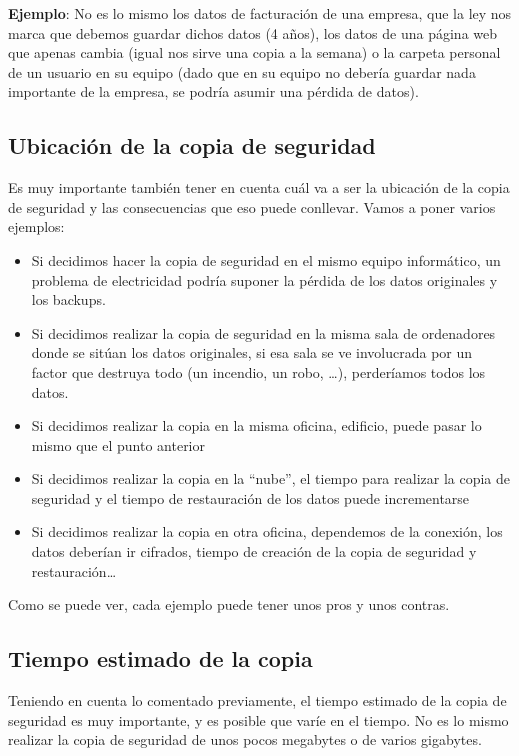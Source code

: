 \textbf{Ejemplo}: No es lo mismo los datos de facturación de una empresa, que la ley nos marca que debemos guardar dichos datos (4 años), los datos de una página web que apenas cambia (igual nos sirve una copia a la semana) o la carpeta personal de un usuario en su equipo (dado que en su equipo no debería guardar nada importante de la empresa, se podría asumir una pérdida de datos).


\subsection{Ubicación de la copia de seguridad}
Es muy importante también tener en cuenta cuál va a ser la ubicación de la copia de seguridad y las consecuencias que eso puede conllevar.
 Vamos a poner varios ejemplos:

\begin{itemize}
    \item Si decidimos hacer la copia de seguridad en el mismo equipo informático, un problema de electricidad podría suponer la pérdida de los datos originales y los backups.
    \item Si decidimos realizar la copia de seguridad en la misma sala de ordenadores donde se sitúan los datos originales, si esa sala se ve involucrada por un factor que destruya todo (un incendio, un robo, …), perderíamos todos los datos.
    \item Si decidimos realizar la copia en la misma oficina, edificio, puede pasar lo mismo que el punto anterior
    \item Si decidimos realizar la copia en la “nube”, el tiempo para realizar la copia de seguridad y el tiempo de restauración de los datos puede incrementarse
    \item Si decidimos realizar la copia en otra oficina, dependemos de la conexión, los datos deberían ir cifrados, tiempo de creación de la copia de seguridad y restauración…

\end{itemize}
Como se puede ver, cada ejemplo puede tener unos pros y unos contras.


\subsection{Tiempo estimado de la copia}
Teniendo en cuenta lo comentado previamente, el tiempo estimado de la copia de seguridad es muy importante, y es posible que varíe en el tiempo. No es lo mismo realizar la copia de seguridad de unos pocos megabytes o de varios gigabytes.

